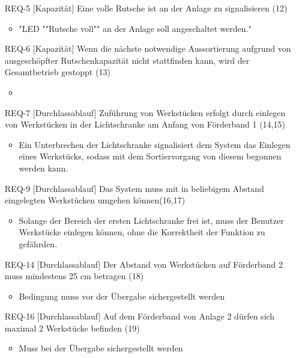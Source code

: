 \begin{itemize}
    \begin{itemize}
        \item
    \end{itemize}
    \item[REQ-5][Kapazität] Eine volle Rutsche ist an der Anlage zu signalisieren (12)
    \begin{itemize}
        \item "LED ""Rutsche voll"" an der Anlage soll angeschaltet werden."
    \end{itemize}
    \item[REQ-6][Kapazität] Wenn die nächste notwendige Aussortierung aufgrund von ausgeschöpfter Rutschenkapazität nicht stattfinden kann, wird der Gesamtbetrieb gestoppt (13)
    \begin{itemize}
        \item
    \end{itemize}
    \item[REQ-7][Durchlassablauf] Zuführung von Werkstücken erfolgt durch einlegen von Werkstücken in der Lichtschranke am Anfang von Förderband 1 (14,15)
    \begin{itemize}
        \item Ein Unterbrechen der Lichtschranke signalisiert dem System das Einlegen eines Werkstücks, sodass mit dem Sortiervorgang von diesem begonnen werden kann.
    \end{itemize}
    \item[REQ-9][Durchlassablauf] Das System muss mit in beliebigem Abstand eingelegten Werkstücken umgehen können(16,17)
    \begin{itemize}
        \item Solange der Bereich der ersten Lichtschranke frei ist, muss der Benutzer Werkstücke einlegen können, ohne die Korrektheit der Funktion zu gefährden.
    \end{itemize}
    \item[REQ-14][Durchlassablauf] Der Abstand von Werkstücken auf Förderband 2 muss mindestens 25 cm betragen (18)
    \begin{itemize}
        \item Bedingung muss vor der Übergabe sichergestellt werden
    \end{itemize}
    \item[REQ-16][Durchlassablauf] Auf dem Förderband von Anlage 2 dürfen sich maximal 2 Werkstücke befinden (19)
    \begin{itemize}
        \item Muss bei der Übergabe sichergestellt werden

\end{itemize}
\end{itemize}
